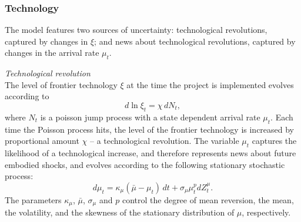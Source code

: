 \documentclass[12pt]{article}
\newcommand{\be}{\begin{equation}}
\newcommand{\ee}{\end{equation}}
\begin{document}



\subsubsection{Technology}

The model features two sources of uncertainty: technological revolutions, captured by changes in $\xi$; and news about technological revolutions, captured by changes in the arrival rate $\mu_t$.


\noindent\emph{Technological revolution}\\
The level of frontier technology $\xi$ at the time the project is implemented  evolves according to
\begin{equation}\label{eqn:xi}
d \ln \xi_t = \chi\, dN_{t},
\end{equation}
where $N_t$ is a poisson jump process with a state dependent arrival rate $\mu_t$. Each time the Poisson process hits, the level of the frontier technology is increased by proportional amount $\chi$ -- a technological revolution. The variable $\mu_t$ captures the likelihood of a technological increase, and therefore represents news about future embodied shocks, and  evolves according to the following stationary stochastic process:
\begin{equation}
d \mu_t = \kappa_\mu (\bar \mu - \mu_t ) \, dt + \sigma_\mu \mu_t^p d Z_t^\mu.
\end{equation}
The parameters $\kappa_\mu$, $\bar\mu$, $\sigma_\mu$ and $p$ control the degree of mean reversion, the  mean, the volatility, and the skewness of the stationary distribution of $\mu$, respectively.

\end{document}

